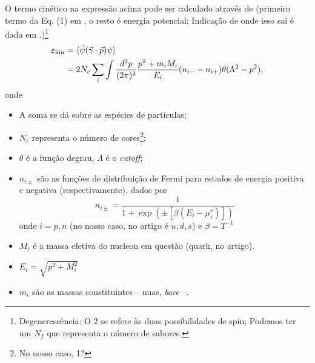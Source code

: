 O termo cinético na expressão acima pode ser calculado através de (primeiro termo da Eq. (1) em \textcite{PRC_68_035804_2003}, o resto é energia potencial; Indicação de onde isso sai é dada em \textcite{japoneses}.)\footnote{Degenerescência: O 2 se refere às duas possibilidades de spin; Podemos ter um $N_f$ que representa o número de sabores.}
\begin{align}
	\varepsilon_{\rm{kin}} &= \langle\bar{\psi}(\vec{\gamma}\cdot\vec{p})\psi\rangle \\
	&= 2 N_c\sum_i \int \frac{d^3p}{(2\pi)^3}\frac{p^2 + m_i M_i}{E_i}(n_{i-}-n_{i+})\theta(\Lambda^2 - p^2),
\end{align}
%
onde
\begin{itemize}
	\item A soma se dá sobre as espécies de partículas;
	\item $N_c$ representa o número de cores\footnote{No nosso caso, 1?};
	\item $\theta$ é a função degrau, $\Lambda$ é o \emph{cutoff};
	\item $n_{i\pm}$ são as funções de distribuição de Fermi para estados de energia positiva e negativa (respectivamente), dados por
	\begin{equation}
		n_{i\pm} = \frac{1}{1 + \exp(\pm[\beta(E_i-\mu_i^r)])}
	\end{equation}
	onde $i = p, n$ (no nosso caso, no artigo é $u, d, s$) e $\beta = T^{-1}$
	\item $M_i$ é a massa efetiva do nucleon em questão (quark, no artigo).
	\item $E_i = \sqrt{p^2 + M_i^2}$
	\item $m_i$ são as massas constituintes -- nuas, \emph{bare} --.
\end{itemize}

